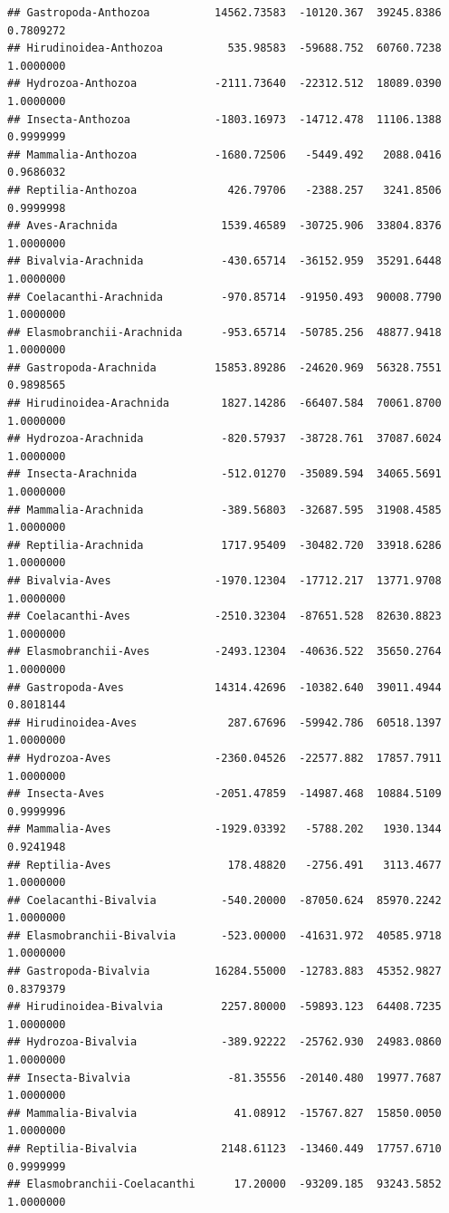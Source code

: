 \documentclass[
  12pt,
]{article}
\begin{document}
\begin{verbatim}
## Gastropoda-Anthozoa          14562.73583  -10120.367  39245.8386 0.7809272
## Hirudinoidea-Anthozoa          535.98583  -59688.752  60760.7238 1.0000000
## Hydrozoa-Anthozoa            -2111.73640  -22312.512  18089.0390 1.0000000
## Insecta-Anthozoa             -1803.16973  -14712.478  11106.1388 0.9999999
## Mammalia-Anthozoa            -1680.72506   -5449.492   2088.0416 0.9686032
## Reptilia-Anthozoa              426.79706   -2388.257   3241.8506 0.9999998
## Aves-Arachnida                1539.46589  -30725.906  33804.8376 1.0000000
## Bivalvia-Arachnida            -430.65714  -36152.959  35291.6448 1.0000000
## Coelacanthi-Arachnida         -970.85714  -91950.493  90008.7790 1.0000000
## Elasmobranchii-Arachnida      -953.65714  -50785.256  48877.9418 1.0000000
## Gastropoda-Arachnida         15853.89286  -24620.969  56328.7551 0.9898565
## Hirudinoidea-Arachnida        1827.14286  -66407.584  70061.8700 1.0000000
## Hydrozoa-Arachnida            -820.57937  -38728.761  37087.6024 1.0000000
## Insecta-Arachnida             -512.01270  -35089.594  34065.5691 1.0000000
## Mammalia-Arachnida            -389.56803  -32687.595  31908.4585 1.0000000
## Reptilia-Arachnida            1717.95409  -30482.720  33918.6286 1.0000000
## Bivalvia-Aves                -1970.12304  -17712.217  13771.9708 1.0000000
## Coelacanthi-Aves             -2510.32304  -87651.528  82630.8823 1.0000000
## Elasmobranchii-Aves          -2493.12304  -40636.522  35650.2764 1.0000000
## Gastropoda-Aves              14314.42696  -10382.640  39011.4944 0.8018144
## Hirudinoidea-Aves              287.67696  -59942.786  60518.1397 1.0000000
## Hydrozoa-Aves                -2360.04526  -22577.882  17857.7911 1.0000000
## Insecta-Aves                 -2051.47859  -14987.468  10884.5109 0.9999996
## Mammalia-Aves                -1929.03392   -5788.202   1930.1344 0.9241948
## Reptilia-Aves                  178.48820   -2756.491   3113.4677 1.0000000
## Coelacanthi-Bivalvia          -540.20000  -87050.624  85970.2242 1.0000000
## Elasmobranchii-Bivalvia       -523.00000  -41631.972  40585.9718 1.0000000
## Gastropoda-Bivalvia          16284.55000  -12783.883  45352.9827 0.8379379
## Hirudinoidea-Bivalvia         2257.80000  -59893.123  64408.7235 1.0000000
## Hydrozoa-Bivalvia             -389.92222  -25762.930  24983.0860 1.0000000
## Insecta-Bivalvia               -81.35556  -20140.480  19977.7687 1.0000000
## Mammalia-Bivalvia               41.08912  -15767.827  15850.0050 1.0000000
## Reptilia-Bivalvia             2148.61123  -13460.449  17757.6710 0.9999999
## Elasmobranchii-Coelacanthi      17.20000  -93209.185  93243.5852 1.0000000

\end{verbatim}
\end{document}
